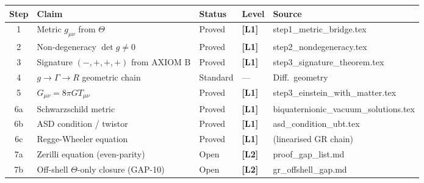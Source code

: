 \documentclass[12pt,a4paper]{article}
\theoremstyle{definition}
\theoremstyle{remark}
\newcommand{\Lone}{\textbf{[L1]}}
\newcommand{\Ltwo}{\textbf{[L2]}}
\newcommand{\Tmunu}{T_{\mu\nu}}            %
\begin{document}
\begin{tcolorbox}[colback=blue!3!white,colframe=blue!60!black,
  title=GR Recovery Chain: Complete Status (April 2026)]
\begin{center}
\begin{tabular}{cllll}
\toprule
\textbf{Step} & \textbf{Claim} & \textbf{Status} & \textbf{Level} & \textbf{Source} \\
\midrule
1  & Metric $g_{\mu\nu}$ from $\Theta$            & Proved & \Lone  & step1\_metric\_bridge.tex \\
2  & Non-degeneracy $\det g\neq 0$                & Proved & \Lone  & step2\_nondegeneracy.tex \\
3  & Signature $(-,+,+,+)$ from AXIOM B           & Proved & \Lone  & step3\_signature\_theorem.tex \\
4  & $g\to\Gamma\to R$ geometric chain            & Standard & —   & Diff.\ geometry \\
5  & $G_{\mu\nu}=8\pi G\Tmunu$                    & Proved & \Lone  & step3\_einstein\_with\_matter.tex \\
6a & Schwarzschild metric                         & Proved & \Lone  & biquaternionic\_vacuum\_solutions.tex \\
6b & ASD condition / twistor                      & Proved & \Lone  & asd\_condition\_ubt.tex \\
6c & Regge-Wheeler equation                       & Proved & \Lone  & (linearised GR chain) \\
7a & Zerilli equation (even-parity)               & Open   & \Ltwo  & proof\_gap\_list.md \\
7b & Off-shell $\Theta$-only closure (GAP-10)     & Open   & \Ltwo  & gr\_offshell\_gap.md \\
\bottomrule
\end{tabular}
\end{center}
\end{tcolorbox}
\end{document}
